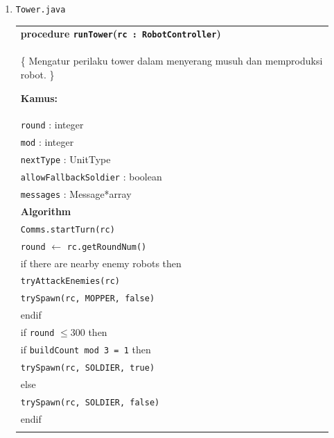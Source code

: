 \documentclass{article}
\newenvironment{pseudobox}
{
\centering
\begin{longtable}{|p{0.94\linewidth}|}
\hline
}
{
\\ \hline
\end{longtable}
\vspace{0.05cm}
}
\begin{document}
\begin{enumerate}[label=\alph*.]
\item \texttt{Tower.java}

\begin{pseudobox}
\textbf{procedure \texttt{runTower}(\texttt{rc : RobotController})} \\
\{ Mengatur perilaku tower dalam menyerang musuh dan memproduksi robot. \}

\textbf{Kamus:} \\
\hspace*{1.5em}\texttt{round} : integer \\
\hspace*{1.5em}\texttt{mod} : integer \\
\hspace*{1.5em}\texttt{nextType} : UnitType \\
\hspace*{1.5em}\texttt{allowFallbackSoldier} : boolean \\
\hspace*{1.5em}\texttt{messages} : Message*array \\

\textbf{Algorithm} \\

\hspace*{1.5em}\texttt{Comms.startTurn(rc)} \\

\hspace*{1.5em}\texttt{round} $\leftarrow$ \texttt{rc.getRoundNum()} \\

\hspace*{1.5em}if there are nearby enemy robots then \\
\hspace*{3em}\texttt{tryAttackEnemies(rc)} \\
\hspace*{3em}\texttt{trySpawn(rc, MOPPER, false)} \\
\hspace*{1.5em}endif \\

\hspace*{1.5em}if \texttt{round} $\leq 300$ then \\

\hspace*{3em}if \texttt{buildCount mod 3 = 1} then \\
\hspace*{4.5em}\texttt{trySpawn(rc, SOLDIER, true)} \\
\hspace*{3em}else \\
\hspace*{4.5em}\texttt{trySpawn(rc, SOLDIER, false)} \\
\hspace*{3em}endif \\


\end{pseudobox}
\end{enumerate}
\end{document}
